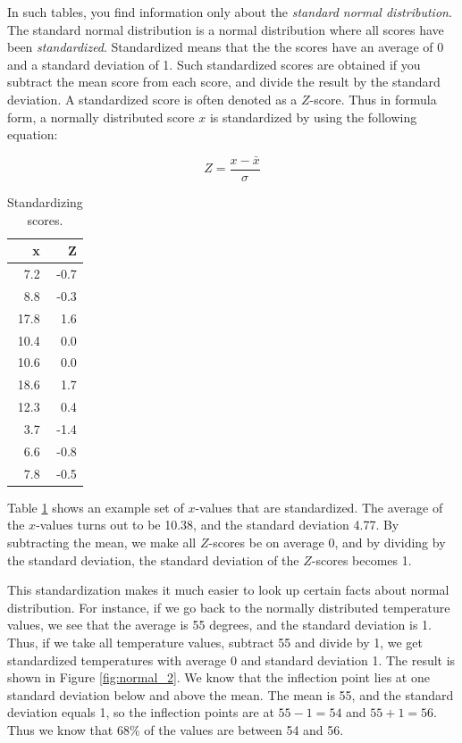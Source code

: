 \documentclass[]{report}\usepackage[]{graphicx}\usepackage[]{color}
\begin{document}
In such tables, you find information only about the \textit{standard normal distribution}. The standard normal distribution is a normal distribution where all scores have been \textit{standardized}. Standardized means that the the scores have an average of 0 and a standard deviation of 1. Such standardized scores are obtained if you subtract the mean score from each score, and divide the result by the standard deviation. A standardized score is often denoted as a $Z$-score. Thus in formula form, a normally distributed score $x$ is standardized by using the following equation:


\begin{equation}
Z = \frac{x - \bar{x}}{\sigma}
\end{equation}



\begin{table}[ht]
\centering
\caption{Standardizing scores.} 
\label{tab:normal_1}
\begin{tabular}{rr}
  \hline
x & Z \\ 
  \hline
7.2 & -0.7 \\ 
  8.8 & -0.3 \\ 
  17.8 & 1.6 \\ 
  10.4 & 0.0 \\ 
  10.6 & 0.0 \\ 
  18.6 & 1.7 \\ 
  12.3 & 0.4 \\ 
  3.7 & -1.4 \\ 
  6.6 & -0.8 \\ 
  7.8 & -0.5 \\ 
   \hline
\end{tabular}
\end{table}


Table \ref{tab:normal_1} shows an example set of $x$-values that are standardized. The average of the $x$-values turns out to be 10.38, and the standard deviation 4.77. By subtracting the mean, we make all $Z$-scores be on average 0, and by dividing by the standard deviation, the standard deviation of the $Z$-scores becomes 1. 

This standardization makes it much easier to look up certain facts about normal distribution. For instance, if we go back to the normally distributed temperature values, we see that the average is 55 degrees, and the standard deviation is 1. Thus, if we take all temperature values, subtract 55 and divide by 1, we get standardized temperatures with average 0 and standard deviation 1. The result is shown in Figure \ref{fig:normal_2}. We know that the inflection point lies at one standard deviation below and above the mean. The mean is 55, and the standard deviation equals 1, so the inflection points are at $55-1=54$ and $55+1=56$. Thus we know that 68\% of the values are between 54 and 56. 
\end{document}

